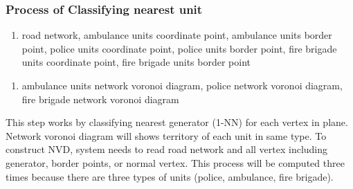 \pagebreak
\subsubsection{Process of Classifying nearest unit}
\begin{enumerate}[label=Input\hspace{5mm} :\hspace{2mm}, leftmargin=*, topsep=0pt, itemsep=-1ex, partopsep=1ex, parsep=1ex]
\item road network, ambulance units coordinate point, ambulance units border point, police units coordinate point, police units border point, fire brigade units coordinate point, fire brigade units border point
\end{enumerate}
\begin{enumerate}[label=Output\hspace{2mm} :\hspace{2mm}, leftmargin=*, topsep=0pt, itemsep=-1ex, partopsep=1ex, parsep=1ex]
\item ambulance units network voronoi diagram, police network voronoi diagram, fire brigade network voronoi diagram
\end{enumerate}
This step works by classifying nearest generator (1-NN) for each vertex in plane. Network voronoi diagram will shows territory of each unit in same type. To construct NVD, system needs to read road network and all vertex including generator, border points, or normal vertex. This process will be computed three times because there are three types of units (police, ambulance, fire brigade).

